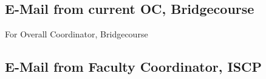 \documentclass{article}
\begin{document}
	\subsection{E-Mail from current OC, Bridgecourse}
		For Overall Coordinator, Bridgecourse
		\begin{figure}[h]
		\end{figure}
\newpage
	\subsection{E-Mail from Faculty Coordinator, ISCP}

\newpage
\end{document}
